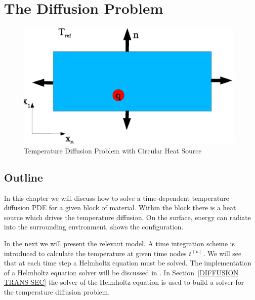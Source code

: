 
%
%
%


\section{The Diffusion Problem}
\label{DIFFUSION CHAP}

\begin{figure}
\centerline{\includegraphics[width=\figwidth]{figures/DiffusionDomain.eps}}
\caption{Temperature Diffusion Problem with Circular Heat Source}
\label{DIFFUSION FIG 1}
\end{figure}

\subsection{\label{DIFFUSION OUT SEC}Outline}
In this chapter we will discuss how to solve a time-dependent temperature diffusion PDE for
a given block of material. Within the block there is a heat source which drives the temperature diffusion.
On the surface, energy can radiate into the surrounding environment.
 shows the configuration.

In the next  we will present the relevant model. A 
time integration scheme is introduced to calculate the temperature at given time nodes $t^{(n)}$. 
We will see that at each time step a Helmholtz equation  
must be solved. 
The implementation of a Helmholtz equation solver will be discussed in . 
In Section~\ref{DIFFUSION TRANS SEC} the solver of the Helmholtz equation is used to build a
solver for the temperature diffusion problem. 

